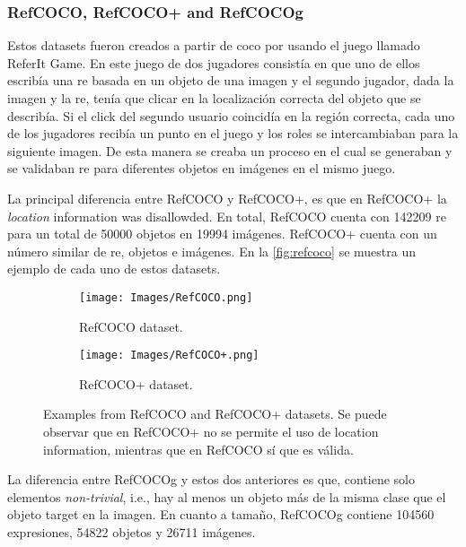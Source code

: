 \subsubsection{RefCOCO, RefCOCO+ and RefCOCOg}
Estos datasets fueron creados a partir de \gls{coco} por
 usando el juego llamado ReferIt Game. En este
juego de dos jugadores consistía en que uno de ellos escribía una \gls{re}
basada en un objeto de una imagen y el segundo jugador, dada la imagen y la
\gls{re}, tenía que clicar en la localización correcta del objeto que se
describía. Si el click del segundo usuario coincidía en la región correcta,
cada uno de los jugadores recibía un punto en el juego y los roles se
intercambiaban para la siguiente imagen. De esta manera se creaba un proceso en
el cual se generaban y se validaban \gls{re} para diferentes objetos en
imágenes en el mismo juego.

La principal diferencia entre RefCOCO y RefCOCO+, es que en RefCOCO+ la
\emph{location} information was disallowded. En total, RefCOCO cuenta con
\num{142209} \gls{re} para un total de \num{50000} objetos en \num{19994}
imágenes. RefCOCO+ cuenta con un número similar de \gls{re}, objetos e
imágenes. En la \vref{fig:refcoco} se muestra un ejemplo de cada uno de estos
datasets.

\begin{figure}[ht]
  \centering
  \begin{subfigure}[t]{.45\textwidth}
    \centering
    \caption{RefCOCO dataset.}
    \texttt{[image: Images/RefCOCO.png]}
  \end{subfigure}
  \begin{subfigure}[t]{.45\textwidth}
    \centering
    \caption{RefCOCO+ dataset.}
    \texttt{[image: Images/RefCOCO+.png]}
  \end{subfigure}
  \caption[Examples from RefCOCO and RefCOCO+ datasets]{Examples from RefCOCO
    and RefCOCO+ datasets. Se puede observar que en RefCOCO+ no se permite el
    uso de location information, mientras que en RefCOCO sí que es válida.}
  \label{fig:refcoco}
\end{figure}

La diferencia entre RefCOCOg y estos dos anteriores es que, contiene solo
elementos \emph{non-trivial}, i.e., hay al menos un objeto más de la misma
clase que el objeto target en la imagen. En cuanto a tamaño, RefCOCOg contiene
\num{104560} expresiones, \num{54822} objetos y \num{26711} imágenes.

